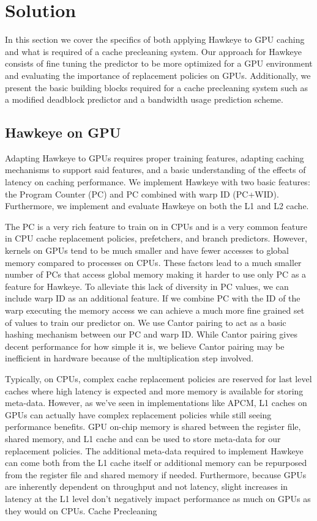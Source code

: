\chapter{Solution}


In this section we cover the specifics of both applying Hawkeye to GPU caching and what is required of a cache precleaning system. Our approach for Hawkeye consists of fine tuning the predictor to be more optimized for a GPU environment and evaluating the importance of replacement policies on GPUs. Additionally, we present the basic building blocks required for a cache precleaning system such as a modified deadblock predictor and a bandwidth usage prediction scheme.

\section{Hawkeye on GPU}
Adapting Hawkeye to GPUs requires proper training features, adapting caching mechanisms to support said features, and a basic understanding of the effects of latency on caching performance. We implement Hawkeye with two basic features: the Program Counter (PC) and PC combined with warp ID (PC+WID). Furthermore, we implement and evaluate Hawkeye on both the L1 and L2 cache.

The PC is a very rich feature to train on in CPUs and is a very common feature in CPU cache replacement policies, prefetchers, and branch predictors. However, kernels on GPUs tend to be much smaller and have fewer accesses to global memory compared to processes on CPUs. These factors lead to a much smaller number of PCs that access global memory making it harder to use only PC as a feature for Hawkeye. To alleviate this lack of diversity in PC values, we can include warp ID as an additional feature. If we combine PC with the ID of the warp executing the memory access we can achieve a much more fine grained set of values to train our predictor on. We use Cantor pairing to act as a basic hashing mechanism between our PC and warp ID. While Cantor pairing gives decent performance for how simple it is, we believe Cantor pairing may be inefficient in hardware because of the multiplication step involved.

Typically, on CPUs, complex cache replacement policies are reserved for last level caches where high latency is expected and more memory is available for storing meta-data. However, as we’ve seen in implementations like APCM, L1 caches on GPUs can actually have complex replacement policies while still seeing performance benefits. GPU on-chip memory is shared between the register file, shared memory, and L1 cache and can be used to store meta-data for our replacement policies. The additional meta-data required to implement Hawkeye can come both from the L1 cache itself or additional memory can be repurposed from the register file and shared memory if needed. Furthermore, because GPUs are inherently dependent on throughput and not latency, slight increases in latency at the L1 level don’t negatively impact performance as much on GPUs as they would on CPUs.
Cache Precleaning

